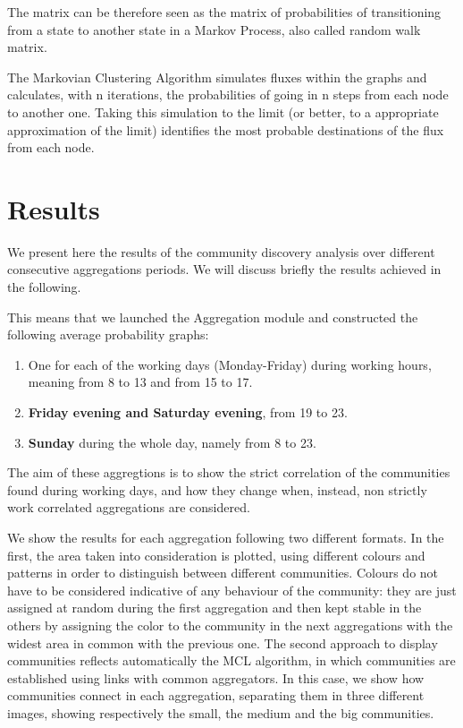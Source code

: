 \documentclass[12pt,a4paper]{article}
\begin{document}
The matrix can be therefore seen as the matrix of probabilities
of transitioning from a state to another state in
a Markov Process, also called random walk matrix.

The Markovian Clustering Algorithm simulates fluxes within the
graphs and calculates, with n iterations, the probabilities of going in
n steps from each node to another one. Taking this simulation to the limit
(or better, to a appropriate approximation of the limit) identifies
the most probable destinations of the flux from each node.



\newpage

\section{Results}
\label{results}

We present here the results of the community discovery analysis
over different consecutive aggregations periods. We will discuss briefly the results
achieved in the following.

This means that we launched the Aggregation module and constructed 
the following average probability graphs:
\begin{enumerate}
\item One for each of the working days (Monday-Friday) during working hours, meaning from 8 to 13 and from 15 to 17.
\item \textbf{Friday evening and Saturday evening}, from 19 to 23.
\item \textbf{Sunday} during the whole day, namely from 8 to 23.
\end{enumerate}
The aim of these aggregtions is to show the strict correlation of the communities found during working days, and how they change when, instead,
non strictly work correlated aggregations are considered. 

We show the results for each aggregation following two different formats.
In the first, the area taken into consideration is plotted, using different colours and patterns in order to distinguish between different communities. Colours do not have to be considered indicative of any behaviour of the community: they are just assigned at random during the first aggregation and then kept stable in the others by assigning the color to the community in the next aggregations with the widest area in common with the previous one.
The second approach to display communities reflects automatically the MCL algorithm, in which communities are established using links with common aggregators. In this case, we show how communities connect in each aggregation, separating them in three different images, showing
respectively the small, the medium and the big communities.
\end{document}
